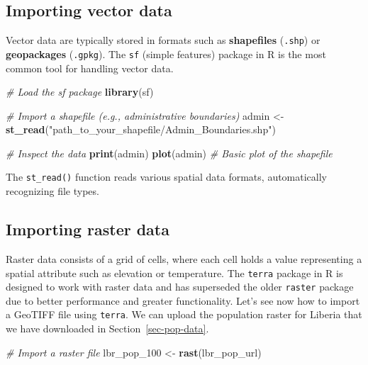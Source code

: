 \documentclass[
  letterpaper,
]{krantz}
\newenvironment{Shaded}{\begin{snugshade}}{\end{snugshade}}
\newcommand{\CommentTok}[1]{\textcolor[rgb]{0.56,0.35,0.01}{\textit{#1}}}
\newcommand{\FunctionTok}[1]{\textcolor[rgb]{0.13,0.29,0.53}{\textbf{#1}}}
\newcommand{\NormalTok}[1]{#1}
\newcommand{\OtherTok}[1]{\textcolor[rgb]{0.56,0.35,0.01}{#1}}
\newcommand{\StringTok}[1]{\textcolor[rgb]{0.31,0.60,0.02}{#1}}
\begin{document}
\subsection{Importing vector data}\label{importing-vector-data}

Vector data are typically stored in formats such as \textbf{shapefiles}
(\texttt{.shp}) or \textbf{geopackages} (\texttt{.gpkg}). The
\texttt{sf} (simple features) package in R is the most common tool for
handling vector data.

\begin{Shaded}
\begin{Highlighting}[]
\CommentTok{\# Load the sf package}
\FunctionTok{library}\NormalTok{(sf)}

\CommentTok{\# Import a shapefile (e.g., administrative boundaries)}
\NormalTok{admin }\OtherTok{\textless{}{-}} \FunctionTok{st\_read}\NormalTok{(}\StringTok{"path\_to\_your\_shapefile/Admin\_Boundaries.shp"}\NormalTok{)}

\CommentTok{\# Inspect the data}
\FunctionTok{print}\NormalTok{(admin)}
\FunctionTok{plot}\NormalTok{(admin)  }\CommentTok{\# Basic plot of the shapefile}
\end{Highlighting}
\end{Shaded}

The \texttt{st\_read()} function reads various spatial data formats,
automatically recognizing file types.

\subsection{Importing raster data}\label{importing-raster-data}

Raster data consists of a grid of cells, where each cell holds a value
representing a spatial attribute such as elevation or temperature. The
\texttt{terra} package in R is designed to work with raster data and has
superseded the older \texttt{raster} package due to better performance
and greater functionality. Let's see now how to import a GeoTIFF file
using \texttt{terra}. We can upload the population raster for Liberia
that we have downloaded in Section~\ref{sec-pop-data}.

\begin{Shaded}
\begin{Highlighting}[]
\CommentTok{\# Import a raster file }
\NormalTok{lbr\_pop\_100 }\OtherTok{\textless{}{-}} \FunctionTok{rast}\NormalTok{(lbr\_pop\_url)}
\end{Highlighting}
\end{Shaded}
\end{document}
